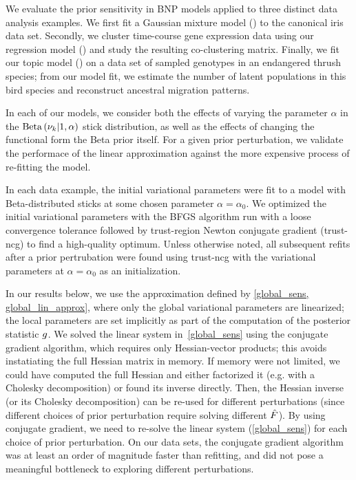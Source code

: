 We evaluate the prior sensitivity in BNP models applied to three distinct data analysis examples.
We first fit a Gaussian mixture model () to the canonical iris data set.
Secondly, we cluster time-course gene expression data using our regression model
() and study the resulting co-clustering matrix.
Finally, we fit our topic model ()
on a data set of sampled genotypes in an endangered thrush species;
from our model fit, we estimate the number of latent populations in this
bird species and reconstruct ancestral migration patterns.

In each of our models, we consider both the effects of varying the parameter $\alpha$
in the $\mathrm{Beta}\left(\nu_{k} \vert 1, \alpha\right)$ stick distribution, as well as
the effects of changing the functional form the Beta prior itself.
For a given prior perturbation,
we validate the performace of the linear approximation against
the more expensive process of re-fitting the model.

In each data example,
the initial variational parameters were fit to a model
with Beta-distributed sticks at some chosen parameter $\alpha = \alpha_0$.
We optimized the initial variational parameters with
the BFGS algorithm run with a loose convergence tolerance
followed by trust-region Newton conjugate gradient (trust-ncg) to find a high-quality optimum.
Unless otherwise noted, all subsequent refits after a prior pertrubation were found
using trust-ncg with the variational parameters at $\alpha = \alpha_0$ as an initialization.

In our results below, we use
the approximation defined by \eqref{global_sens, global_lin_approx},
where only the global variational parameters are linearized;
the local parameters are set implicitly as part of the
computation of the posterior statistic $g$.
We solved the linear system in~\eqref{global_sens} using
the conjugate gradient algorithm, which requires only Hessian-vector products;
this avoids instatiating the full Hessian matrix in memory.
If memory were not limited,
we could have computed the full Hessian and
either factorized it (e.g. with a Cholesky decomposition) or found its inverse directly.
Then, the Hessian inverse (or its Cholesky decomposition) can
be re-used for different perturbations
(since different choices of prior perturbation
require solving different $\hat F$).
By using conjugate gradient, we need to re-solve the linear system (\eqref{global_sens})
for each choice of prior perturbation.
On our data sets, the conjugate gradient algorithm was at least
an order of magnitude faster than refitting, and did not pose a meaningful bottleneck
to exploring different perturbations.

